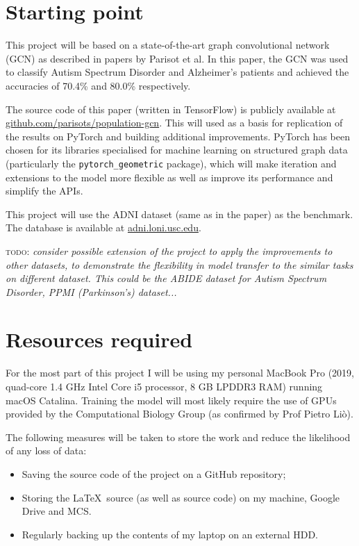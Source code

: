 \documentclass[12pt,a4paper,twoside]{article}
\begin{document}
\section*{Starting point}


This project will be based on a state-of-the-art graph convolutional network (GCN) as described in papers by Parisot et al. \cite{parisot2017spectral} \cite{parisot2018disease} In this paper, the GCN was used to classify Autism Spectrum Disorder and Alzheimer's patients and achieved the accuracies of 70.4\% and 80.0\% respectively. 

The source code of this paper (written in TensorFlow) is publicly available at \url{github.com/parisots/population-gcn}. This will used as a basis for replication of the results on PyTorch and building additional improvements. PyTorch has been chosen for its libraries specialised for machine learning on structured graph data (particularly the \texttt{pytorch\_geometric} package), which will make iteration and extensions to the model more flexible as well as improve its performance and simplify the APIs.

This project will use the ADNI dataset (same as in the paper) as the benchmark. The database is available at \url{adni.loni.usc.edu}.

\textsc{todo:} \textit{consider possible extension of the project to apply the improvements to other datasets, to demonstrate the flexibility in model transfer to the similar tasks on different dataset. This could be the ABIDE dataset for Autism Spectrum Disorder, PPMI (Parkinson's) dataset...}

\section*{Resources required}

For the most part of this project I will be using my personal MacBook Pro (2019, quad-core 1.4 GHz Intel Core i5 processor, 8 GB LPDDR3 RAM) running macOS Catalina. Training the model will most likely require the use of GPUs provided by the Computational Biology Group (as confirmed by Prof Pietro Liò).

The following measures will be taken to store the work and reduce the likelihood of any loss of data: 
\begin{itemize}
  \item Saving the source code of the project on a GitHub repository;
  \item Storing the \LaTeX\ source (as well as source code) on my machine, Google Drive and MCS.
  \item Regularly backing up the contents of my laptop on an external HDD.
\end{itemize}
\end{document}
